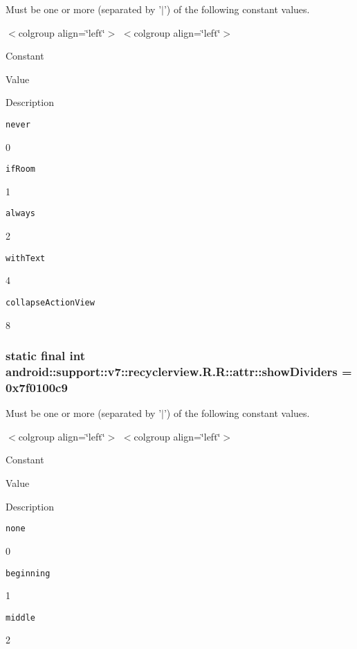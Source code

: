 Must be one or more (separated by '$|$') of the following constant values. \begin{TabularC}{0}
\hline
\end{TabularC}
$<$colgroup align=\char`\"{}left\char`\"{}$>$ $<$colgroup align=\char`\"{}left\char`\"{}$>$ 

Constant

Value

Description 

{\tt never}

0

{\tt ifRoom}

1

{\tt always}

2

{\tt withText}

4

{\tt collapseActionView}

8\hypertarget{classandroid_1_1support_1_1v7_1_1recyclerview_1_1_r_1_1attr_ac1710dac02f10a25d240e4053510474}{
\subsubsection[{showDividers}]{\setlength{\rightskip}{0pt plus 5cm}static final int android::support::v7::recyclerview.R.R::attr::showDividers = 0x7f0100c9}}
\label{classandroid_1_1support_1_1v7_1_1recyclerview_1_1_r_1_1attr_ac1710dac02f10a25d240e4053510474}


Must be one or more (separated by '$|$') of the following constant values. \begin{TabularC}{0}
\hline
\end{TabularC}
$<$colgroup align=\char`\"{}left\char`\"{}$>$ $<$colgroup align=\char`\"{}left\char`\"{}$>$ 

Constant

Value

Description 

{\tt none}

0

{\tt beginning}

1

{\tt middle}

2

